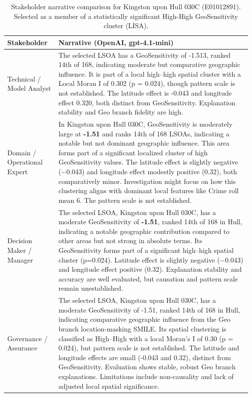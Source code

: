 \begin{table}[H]
\centering
\caption{Stakeholder narrative comparison for Kingston upon Hull 030C (E01012891). Selected as a member of a statistically significant High-High GeoSensitivity cluster (LISA).}
\label{tab:stakeholder_narratives_hh_cluster}
\small
\begin{tabularx}{\textwidth}{p{} X}
\toprule
Stakeholder & Narrative (OpenAI, {\ttfamily gpt-4.1-mini}) \\
\midrule
Technical / Model Analyst &
The selected LSOA has a GeoSensitivity of -1.513, ranked 14th of 168, indicating moderate but comparative geographic influence. It is part of a local high–high spatial cluster with a Local Moran I of 0.302 (p = 0.024), though pattern scale is not established. The latitude effect is -0.043 and longitude effect 0.320, both distinct from GeoSensitivity. Explanation stability and Geo branch fidelity are high. \\
Domain / Operational Expert &
In Kingston upon Hull 030C, GeoSensitivity is moderately large at \textbf{-1.51} and ranks 14th of 168 LSOAs, indicating a notable but not dominant geographic influence. This area forms part of a significant localized cluster of high GeoSensitivity values. The latitude effect is slightly negative (−0.043) and longitude effect modestly positive (0.32), both comparatively minor. Investigation might focus on how this clustering aligns with dominant local features like Crime roll mean 6. The pattern scale is not established. \\
Decision Maker / Manager &
The selected LSOA, Kingston upon Hull 030C, has a moderate GeoSensitivity of \textbf{-1.51}, ranked 14th of 168 in Hull, indicating a notable geographic contribution compared to other areas but not strong in absolute terms. Its GeoSensitivity forms part of a significant high–high spatial cluster (p=0.024). Latitude effect is slightly negative (−0.043) and longitude effect positive (0.32). Explanation stability and accuracy are well evaluated, but causation and pattern scale remain unestablished. \\
Governance / Assurance &
The selected LSOA, Kingston upon Hull 030C, has a moderate GeoSensitivity of -1.51, ranked 14th of 168 in Hull, indicating comparative geographic influence from the Geo branch location-masking SMILE. Its spatial clustering is classified as High–High with a local Moran's I of 0.30 (p = 0.024), but pattern scale is not established. The latitude and longitude effects are small (-0.043 and 0.32), distinct from GeoSensitivity. Evaluation shows stable, robust Geo branch explanations. Limitations include non-causality and lack of adjusted local spatial significance. \\

\end{tabularx}
\end{table}
